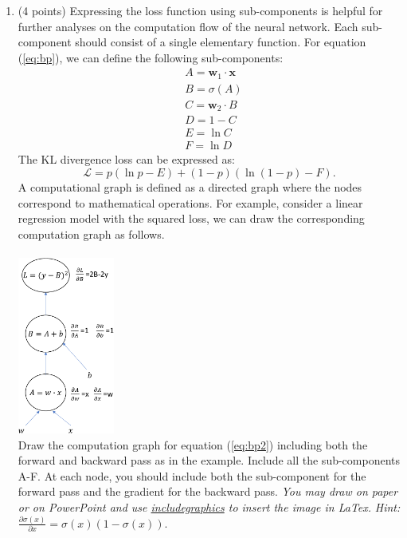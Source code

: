 \documentclass[11pt]{article}
\begin{document}
\begin{enumerate}[(1)]
    \item (4 points) Expressing the loss function using sub-components is helpful for further analyses on the computation flow of the neural network. Each sub-component should consist of a single elementary function. For equation (\ref{eq:bp}), we can define the following sub-components:
    \begin{align*}
        &A = \mathbf{w}_1 \cdot \mathbf{x}\\
        &B = \sigma(A) \\
        &C = \mathbf{w}_2 \cdot B \\
        &D = 1-C \\
        &E = \ln C \\
        &F = \ln D
    \end{align*}
    The KL divergence loss can be expressed as:
    \begin{equation}\label{eq:bp2}
        \mathcal{L} = p(\ln p - E) + (1-p)(\ln (1-p) - F).
    \end{equation}
    A computational graph is defined as a directed graph where the nodes correspond to mathematical operations. For example, consider a linear regression model with the squared loss, we can draw the corresponding computation graph as follows.\\\\
    \includegraphics[width=0.25\textwidth]{bp_example.pdf}\\
    Draw the computation graph for equation (\ref{eq:bp2}) including both the forward and backward pass as in the example. Include all the sub-components A-F. At each node, you should include both the sub-component for the forward pass and the gradient for the backward pass. \textit{You may draw on paper or on PowerPoint and use \href{https://www.overleaf.com/learn/latex/Inserting_Images}{includegraphics} to insert the image in LaTex.}
    \textit{Hint: $\frac{\partial \sigma(x)}{\partial x}=\sigma(x)(1-\sigma(x)).$}
\newpage
    

\end{enumerate}
\end{document}
